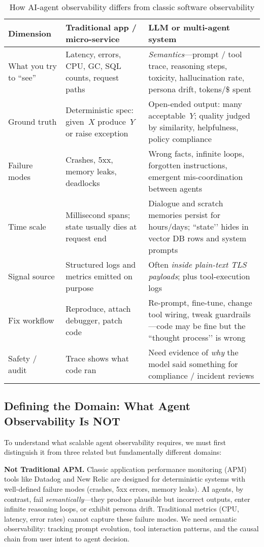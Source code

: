 \documentclass[sigplan,screen，review,9pt]{acmart}
\begin{document}
\begin{table*}[t]
  \caption{How AI-agent observability differs from classic software observability}
  \label{tab:diff}
  \begin{tabularx}{\linewidth}{@{}>{\raggedright\arraybackslash}p{2.85cm}X X@{}}
    \toprule
    \textbf{Dimension} &
    \textbf{Traditional app / micro-service} &
    \textbf{LLM or multi-agent system} \\
    \midrule
    What you try to “see” &
    Latency, errors, CPU, GC, SQL counts, request paths &
    \emph{Semantics}—prompt / tool trace, reasoning steps, toxicity, hallucination rate, persona drift, tokens/\$ spent \\
    Ground truth &
    Deterministic spec: given~$X$ produce~$Y$ or raise exception &
    Open-ended output: many acceptable~$Y$; quality judged by similarity, helpfulness, policy compliance \\
    Failure modes &
    Crashes, 5xx, memory leaks, deadlocks &
    Wrong facts, infinite loops, forgotten instructions, emergent mis-coordination between agents \\
    Time scale &
    Millisecond spans; state usually dies at request end &
    Dialogue and scratch memories persist for hours/days; “state’’ hides in vector DB rows and system prompts \\
    Signal source &
    Structured logs and metrics emitted on purpose &
    Often \emph{inside plain-text TLS payloads}; plus tool-execution logs \\
    Fix workflow &
    Reproduce, attach debugger, patch code &
    Re-prompt, fine-tune, change tool wiring, tweak guardrails—code may be fine but the “thought process’’ is wrong \\
    Safety / audit &
    Trace shows what code ran &
    Need evidence of \emph{why} the model said something for compliance / incident reviews \\
    \bottomrule
  \end{tabularx}
\end{table*}

\subsection{Defining the Domain: What Agent Observability Is NOT}

To understand what scalable agent observability requires, we must first distinguish it from three related but fundamentally different domains:

\textbf{Not Traditional APM.} Classic application performance monitoring (APM) tools like Datadog and New Relic are designed for deterministic systems with well-defined failure modes (crashes, 5xx errors, memory leaks). AI agents, by contrast, fail \emph{semantically}—they produce plausible but incorrect outputs, enter infinite reasoning loops, or exhibit persona drift. Traditional metrics (CPU, latency, error rates) cannot capture these failure modes. We need semantic observability: tracking prompt evolution, tool interaction patterns, and the causal chain from user intent to agent decision.
\end{document}
